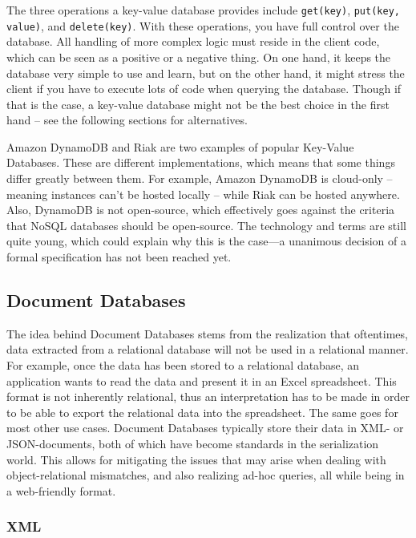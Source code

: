 The three operations a key-value database provides include \texttt{get(key)},
\texttt{put(key, value)}, and \texttt{delete(key)}. With these operations, you
have full control over the database. All handling of more complex logic must
reside in the client code, which can be seen as a positive or a negative thing.
On one hand, it keeps the database very simple to use and learn, but on the
other hand, it might stress the client if you have to execute lots of code when
querying the database. Though if that is the case, a key-value database might
not be the best choice in the first hand -- see the following sections for
alternatives.

Amazon DynamoDB and Riak are two examples of popular Key-Value Databases. These
are different implementations, which means that some things differ greatly
between them. For example, Amazon DynamoDB is cloud-only -- meaning instances
can't be hosted locally -- while Riak can be hosted anywhere. Also, DynamoDB is
not open-source, which effectively goes against the criteria that NoSQL
databases should be open-source. The technology and terms are still quite young,
which could explain why this is the case---a unanimous decision of a formal
specification has not been reached yet.


\subsection{Document Databases}
\label{intro-doc-db}
The idea behind Document Databases stems from the realization that oftentimes,
data extracted from a relational database will not be used in a relational
manner. For example, once the data has been stored to a relational database,
an application wants to read the data and present it in an Excel spreadsheet.
This format is not inherently relational, thus an interpretation has to be made
in order to be able to export the relational data into the spreadsheet. The same
goes for most other use cases. Document Databases typically store their data in
XML- or JSON-documents, both of which have become standards in the serialization
world. This allows for mitigating the issues that may arise when dealing with
object-relational mismatches, and also realizing ad-hoc queries, all while
being in a web-friendly format.

\subsubsection{XML}
\label{intro-doc-xml}

